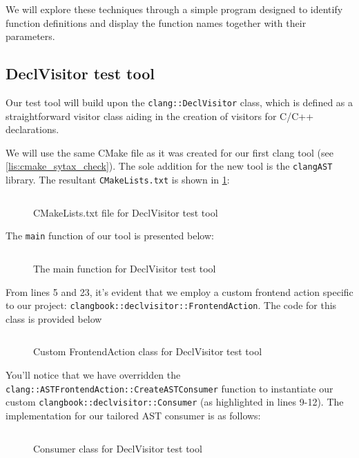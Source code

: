 We will explore these techniques through a simple program  designed to identify
function definitions and display the function names together with their
parameters.  

\subsection{DeclVisitor test tool}
Our test tool will build upon the \texttt{clang::DeclVisitor} class,
which is defined as a straightforward visitor class aiding in the creation of
visitors for C/C++ declarations. 

We will use the same CMake file as it was 
created for our first clang tool (see \cref{lis:cmake_sytax_check}). The sole
addition for the new tool is the \texttt{clangAST} library. The resultant
\texttt{CMakeLists.txt} is shown in \cref{lis:cmake:declvisitor}:
\begin{figure}[H]
\inputminted[highlightlines={19},
  firstline=2,lastline=24]{cmake}{src/part1/ch3_ast/declvisitor/CMakeLists.txt}
\caption{CMakeLists.txt file for DeclVisitor test tool}
\label{lis:cmake:declvisitor}
\end{figure}

The \texttt{main} function of our tool is presented below:
\begin{figure}[H]
  \inputminted[highlightlines={5,23}]{c++}{src/part1/ch3_ast/declvisitor/DeclVisitor.cpp}
  \caption{The main function for DeclVisitor test tool}
  \label{lis:main:declvisitor}
\end{figure}

From lines 5 and 23, it's evident that we employ a custom frontend action
specific to our project:
\texttt{clangbook::declvisitor::FrontendAction}. The code for this
class is provided below
\begin{figure}[H]
\inputminted[highlightlines={9-12}]{c++}{src/part1/ch3_ast/declvisitor/FrontendAction.hpp}
  \caption{Custom FrontendAction class for DeclVisitor test tool}
  \label{lis:frontendaction:declvisitor}
\end{figure}

You'll notice that we have overridden the
\texttt{clang::ASTFrontendAction::CreateASTConsumer} function to
instantiate our custom \texttt{clangbook::declvisitor::Consumer} (as
highlighted in lines 9-12). The implementation for our tailored AST consumer is as
follows:
\begin{figure}[H]
\inputminted{c++}{src/part1/ch3_ast/declvisitor/Consumer.hpp}
\caption{Consumer class for DeclVisitor test tool}
\label{lis:consumer:declvisitor}
\end{figure}

